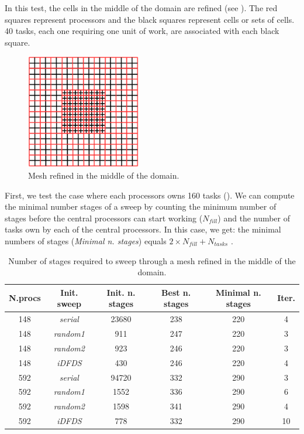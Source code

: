 \documentclass{mc2015}
\renewcommand{\(}{\left(}
\renewcommand{\)}{\right)}
\renewcommand{\[}{\left[}
\renewcommand{\]}{\right]}
\begin{document}
In this test, the cells in the middle of the domain are refined (see ).
The red squares represent processors and the black squares represent cells
or sets of cells. 40 tasks, each one requiring one unit of work, are
associated with each black square.

\begin{figure}[H]
  \centering
  \includegraphics[width=5cm]{mesh}
  \caption{Mesh refined in the middle of the domain.}
  \label{mesh_1}
\end{figure}

First, we test the case where each processors owns 160 tasks (). 
We can compute the minimal number stages of a sweep by counting the minimum number of stages before the
central processors can start working ($N_{fill}$) and the number of tasks own by
each of the central processors. In this case, we get: the minimal numbers of stages
(\emph{Minimal n. stages}) equals $2\times N_{fill}+N_{tasks}$ \cite{Adams2013}.

\begin{table}[H]
  \begin{center}
    \caption{Number of stages required to sweep through a mesh refined
    in the middle of the domain.}
    \begin{tabular}{|c|c|c|c|c|c|}
      \hline
      N.procs & Init. sweep & Init. n. stages & Best n. stages & Minimal n. stages & Iter. \\
      \hline
      148 &  \emph{serial} & 23680 & 238 & 220 &  4 \\
      148 & \emph{random1} &   911 & 247 & 220 &  3 \\
      148 & \emph{random2} &   923 & 246 & 220 &  3 \\
      148 &   \emph{iDFDS} &   430 & 246 & 220 &  4 \\
      592 &  \emph{serial} & 94720 & 332 & 290 &  3 \\
      592 & \emph{random1} &  1552 & 336 & 290 &  6 \\
      592 & \emph{random2} &  1598 & 341 & 290 &  4 \\
      592 &   \emph{iDFDS} &   778 & 332 & 290 & 10 \\
      \hline
    \end{tabular}
    \label{amr_1}
  \end{center}
\end{table}
\end{document}
